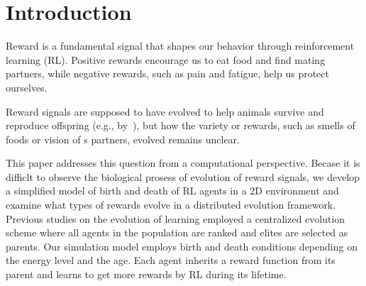\section{Introduction}\label{sec:intro}
Reward is a fundamental signal that shapes our behavior through reinforcement learning (RL). 
Positive rewards encourage us to eat food and find mating partners, while negative rewards, such as pain and fatigue, help us protect ourselves. 

Reward signals are supposed to have evolved to help animals survive and reproduce offspring (e.g., by~\cite{schultzNeuronalRewardDecision2015}), but how the variety or rewards, such as smells of foods or vision of s partners, 
evolved remains unclear.

This paper addresses this question from a computational perspective. 
Becase it is difficlt to observe the biological prosess of evolution of reward signals, we develop a simplified model of birth and death of RL agents in a 2D environment and examine what types of rewards evolve in a
distributed evolution framework.
Previous studies on the evolution of learning \citep{hintonHowLearningCan1987,singhWhereRewardsCome2009} employed a centralized evolution scheme where all agents in the population are ranked and elites are selected as parents.
Our simulation model employs birth and death conditions depending on the energy level and the age. Each agent inherits a reward function from its parent and learns to get more rewards by RL during its lifetime. %

